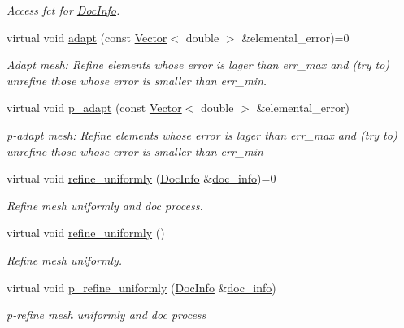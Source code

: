 \begin{DoxyCompactItemize}
\begin{DoxyCompactList}\small\item\em Access fct for \hyperlink{classoomph_1_1DocInfo}{Doc\+Info}. \end{DoxyCompactList}\item 
virtual void \hyperlink{classoomph_1_1RefineableMeshBase_aabe38fc56f2f12e91f2a2e8a4cf663b0}{adapt} (const \hyperlink{classoomph_1_1Vector}{Vector}$<$ double $>$ \&elemental\+\_\+error)=0
\begin{DoxyCompactList}\small\item\em Adapt mesh\+: Refine elements whose error is lager than err\+\_\+max and (try to) unrefine those whose error is smaller than err\+\_\+min. \end{DoxyCompactList}\item 
virtual void \hyperlink{classoomph_1_1RefineableMeshBase_a03222065e7dfe9eac96fbd58faf0e4ab}{p\+\_\+adapt} (const \hyperlink{classoomph_1_1Vector}{Vector}$<$ double $>$ \&elemental\+\_\+error)
\begin{DoxyCompactList}\small\item\em p-\/adapt mesh\+: Refine elements whose error is lager than err\+\_\+max and (try to) unrefine those whose error is smaller than err\+\_\+min \end{DoxyCompactList}\item 
virtual void \hyperlink{classoomph_1_1RefineableMeshBase_afe5810e718ce1939f3f81e3eb5743768}{refine\+\_\+uniformly} (\hyperlink{classoomph_1_1DocInfo}{Doc\+Info} \&\hyperlink{classoomph_1_1RefineableMeshBase_a266f8b2a1499cc2ae7b24b19813923ee}{doc\+\_\+info})=0
\begin{DoxyCompactList}\small\item\em Refine mesh uniformly and doc process. \end{DoxyCompactList}\item 
virtual void \hyperlink{classoomph_1_1RefineableMeshBase_aa96201d241ce05bb33bce687632470be}{refine\+\_\+uniformly} ()
\begin{DoxyCompactList}\small\item\em Refine mesh uniformly. \end{DoxyCompactList}\item 
virtual void \hyperlink{classoomph_1_1RefineableMeshBase_a443bfce7586aecfa50b4b8a6c6078710}{p\+\_\+refine\+\_\+uniformly} (\hyperlink{classoomph_1_1DocInfo}{Doc\+Info} \&\hyperlink{classoomph_1_1RefineableMeshBase_a266f8b2a1499cc2ae7b24b19813923ee}{doc\+\_\+info})
\begin{DoxyCompactList}\small\item\em p-\/refine mesh uniformly and doc process \end{DoxyCompactList}\item 

\end{DoxyCompactItemize}

